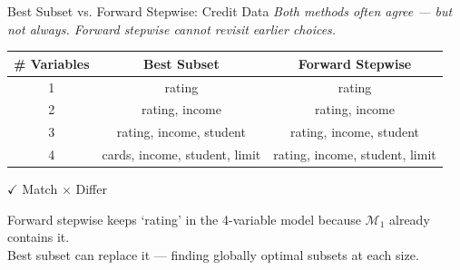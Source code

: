 \documentclass[ignorenonframetext,]{beamer}
\begin{document}
\begin{frame}{Best Subset vs. Forward Stepwise: Credit Data}
\emph{Both methods often agree --- but not always. Forward stepwise cannot revisit earlier choices.}

\begin{center}
\small
\begin{tabular}{ccc}
\toprule
\textbf{\# Variables} & \textbf{Best Subset} & \textbf{Forward Stepwise}\\
\midrule
1 & \colorbox{green!15}{rating} & \colorbox{green!15}{rating}\\
2 & \colorbox{green!15}{rating, income} & \colorbox{green!15}{rating, income}\\
3 & \colorbox{green!15}{rating, income, student} & \colorbox{green!15}{rating, income, student}\\
4 & \colorbox{red!15}{cards, income, student, limit} & \colorbox{red!15}{rating, income, student, limit}\\
\bottomrule
\end{tabular}

\vspace{4pt}
{\footnotesize \colorbox{green!15}{$\checkmark$ Match} \quad \colorbox{red!15}{$\times$ Differ}}
\end{center}

\begin{block}{}
\footnotesize
Forward stepwise keeps `rating' in the 4-variable model because $\mathcal{M}_1$ already contains it.\\
Best subset can replace it --- finding globally optimal subsets at each size.
\end{block}
\end{frame}
\end{document}
